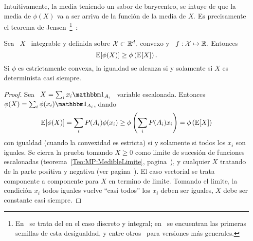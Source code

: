 %
Intuitivamente, la  media teniendo un sabor  de barycentro, se intuye  de que la
media  de $\phi(X)$ va  a ser  arriva de  la funci\'on  de la  media de  $X$. Es
precisamente el  teorema de Jensen~\footnote{En~\cite{Jen06} se trata  del en el
  caso discreto  y integral; en~\cite{Hol89,  Had93} se encuentran  las primeras
  semillas de  esta desigualdad,  y entre otros~\cite{Jes31:I,  Jes31:II, Per74,
    Rud91}  para versiones  m\'as generales.\label{Foot:SZ:Jensen}}~\cite{Jen06,
 Fel71, Bre88, AthLah06, Coh13}:
%
\begin{teorema}
\label{Teo:MP:Jensen}
%
  Sea \ $X$ \ integrable y definida  sobre $\mathcal{X} \subset \mathbb{R}^d$, convexo y \ $f:
  \mathcal{X} \mapsto \mathbb{R}$. Entonces
  \[
  \operatorname{E}[\phi(X)] \ge \phi\left( \operatorname{E}[X] \right).
  \]
  Si $\phi$ es  estrictamente convexa, la igualdad se alcanza  si y solamente si
  $X$ es determinista casi siempre.
\end{teorema}
%
\begin{proof}
  Sea \ $X = \sum_i x_i  \un_{A_i}$ \ variable escalonada. Entonces \ $\phi(X) =
  \sum_i \phi(x_i) \un_{A_i}$, dando
  \[
  \operatorname{E}[\phi(X)]  = \sum_i  P(A_i)  \phi(x_i) \ge  \phi\left(  \sum_i P(A_i)  x_i
  \right) = \phi\left( \operatorname{E}[X] \right)
  \]
  con igualdad  (cuando la convexidad es  estricta) si y solamente  si todos los
  $x_i$  son iguales.  Se  cierra la  prueba tomando  $X \ge  0$ como  limite de
  sucesi\'on   de   funciones  escalonadas   (teorema~\ref{Teo:MP:MedibleLimite},
  pagina~\pageref{Teo:MP:MedibleLimite}),  y cualquier $X$  tratando de  la parte
  positiva  y  negativa  (ver  pagina~\pageref{Teo:MP:MedibleLimite}).   El  caso
  vectorial  se   trata  componente  a   componente  para  $X$  en   termino  de
  limite. Tomando  el limite, la  condici\'on $x_i$ todos iguales  vuelve ``casi
  todos'' los $x_i$ deben ser iguales, \ie $X$ debe ser constante casi siempre.
\end{proof}

